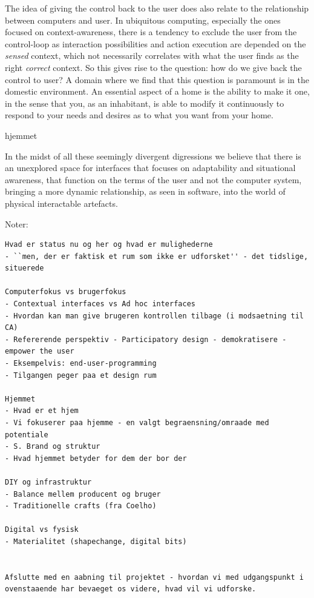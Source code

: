 \blank
The idea of giving the control back to the user does also relate to the relationship between computers and user.
In ubiquitous computing, especially the ones focused on context-awareness, there is a tendency to exclude the user from the control-loop as interaction possibilities and action execution are depended on the \emph{sensed} context, which not necessarily correlates with what the user finds as the right \emph{correct} context.
So this gives rise to the question: how do we give back the control to user?
\blank
A domain where we find that this question is paramount is in the domestic environment.
An essential aspect of a home is the ability to make it one, in the sense that you, as an inhabitant, is able to modify it continuously to respond to your needs and desires as to what you want from your home.

hjemmet
\blank
{}

In the midst of all these seemingly divergent digressions we believe that there is an unexplored space for interfaces that focuses on adaptability and situational awareness, that function on the terms of the user and not the computer system, bringing a more dynamic relationship, as seen in software, into the world of physical interactable artefacts.  

Noter:
\begin{verbatim}
Hvad er status nu og her og hvad er mulighederne
- ``men, der er faktisk et rum som ikke er udforsket'' - det tidslige, situerede

Computerfokus vs brugerfokus
- Contextual interfaces vs Ad hoc interfaces
- Hvordan kan man give brugeren kontrollen tilbage (i modsaetning til CA)
- Refererende perspektiv - Participatory design - demokratisere - empower the user
- Eksempelvis: end-user-programming
- Tilgangen peger paa et design rum

Hjemmet
- Hvad er et hjem
- Vi fokuserer paa hjemme - en valgt begraensning/omraade med potentiale
- S. Brand og struktur
- Hvad hjemmet betyder for dem der bor der

DIY og infrastruktur
- Balance mellem producent og bruger
- Traditionelle crafts (fra Coelho)

Digital vs fysisk
- Materialitet (shapechange, digital bits)


Afslutte med en aabning til projektet - hvordan vi med udgangspunkt i ovenstaaende har bevaeget os videre, hvad vil vi udforske.
\end{verbatim}